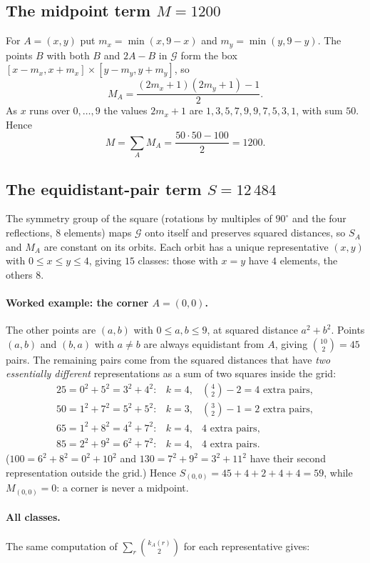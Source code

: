 \documentclass[11pt,a4paper]{article}
\theoremstyle{remark}
\newcommand{\G}{\mathcal{G}}
\begin{document}
\subsection{The midpoint term $M=1200$}

For $A=(x,y)$ put $m_x=\min(x,9-x)$ and $m_y=\min(y,9-y)$. The points $B$ with both
$B$ and $2A-B$ in $\G$ form the box $[x-m_x,x+m_x]\times[y-m_y,y+m_y]$, so
\[
  M_A=\frac{(2m_x+1)(2m_y+1)-1}{2}.
\]
As $x$ runs over $0,\dots,9$ the values $2m_x+1$ are $1,3,5,7,9,9,7,5,3,1$, with sum
$50$. Hence
\[
  M=\sum_{A}M_A=\frac{50\cdot50-100}{2}=1200 .
\]

\subsection{The equidistant-pair term $S=12\,484$}

The symmetry group of the square (rotations by multiples of $90^\circ$ and the
four reflections, $8$ elements) maps $\G$ onto itself and preserves squared
distances, so $S_A$ and $M_A$ are constant on its orbits. Each orbit has a unique
representative $(x,y)$ with $0\le x\le y\le 4$, giving $15$ classes: those with
$x=y$ have $4$ elements, the others $8$.

\paragraph{Worked example: the corner $A=(0,0)$.} The other points are $(a,b)$ with
$0\le a,b\le 9$, at squared distance $a^2+b^2$. Points $(a,b)$ and $(b,a)$ with
$a\neq b$ are always equidistant from $A$, giving $\binom{10}{2}=45$ pairs. The
remaining pairs come from the squared distances that have \emph{two essentially
different} representations as a sum of two squares inside the grid:
\[
\begin{array}{lll}
  25=0^2+5^2=3^2+4^2: & k=4, & \binom42-2=4 \text{ extra pairs},\\
  50=1^2+7^2=5^2+5^2: & k=3, & \binom32-1=2 \text{ extra pairs},\\
  65=1^2+8^2=4^2+7^2: & k=4, & 4 \text{ extra pairs},\\
  85=2^2+9^2=6^2+7^2: & k=4, & 4 \text{ extra pairs}.
\end{array}
\]
($100=6^2+8^2=0^2+10^2$ and $130=7^2+9^2=3^2+11^2$ have their second
representation outside the grid.) Hence $S_{(0,0)}=45+4+2+4+4=59$, while
$M_{(0,0)}=0$: a corner is never a midpoint.

\paragraph{All classes.} The same computation of $\sum_r\binom{k_A(r)}{2}$ for each
representative gives:
\end{document}
